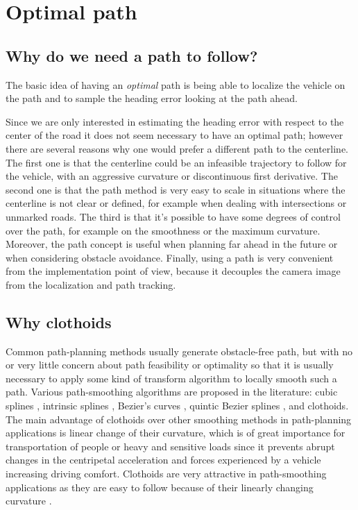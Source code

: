 \documentclass[a4paper,12pt,sort&compress]{article}
\begin{document}
\section{Optimal path}

    \subsection{Why do we need a path to follow?}
    The basic idea of having an \textit{optimal} path is being able to localize the vehicle on the
    path and to sample the heading error looking at the path ahead. 

    Since we are only interested in estimating the heading error with respect to the center of the
    road it does not seem necessary to have an optimal path; however there are several reasons
    why one would prefer a different path to the centerline. The first one is that the centerline
    could be an infeasible trajectory to follow for the vehicle, with an aggressive curvature or
    discontinuous first derivative. The second one is that the path
    method is very easy to scale in situations where the centerline is not clear or defined, for
    example when dealing with intersections or unmarked roads. The third is that it's possible to
    have some degrees of control over the path, for example on the smoothness or the maximum
    curvature. Moreover, the path concept is useful when planning far ahead in the future or when
    considering obstacle avoidance. Finally, using a path is very convenient from the implementation point of
    view, because it decouples the camera image from the localization and path tracking.

    \subsection{Why clothoids}
    Common path-planning methods usually generate obstacle-free path, but with no or very little concern
    about path feasibility or optimality so that it is usually necessary to apply some kind of transform
    algorithm to locally smooth such a path. Various path-smoothing algorithms are proposed in the
    literature: cubic splines \citep*{kanayama1988smooth}, intrinsic splines
    \citep*{delingette1991trajectory}, Bezier's curves \citep*{segovia1991comparative}, quintic
    Bezier splines \citep*{lau2009kinodynamic}, and clothoids. The main advantage of clothoids over
    other smoothing methods in path-planning
    applications is linear change of their curvature, which is of great importance for transportation of
    people or heavy and sensitive loads since it prevents abrupt changes in the centripetal acceleration
    and forces experienced by a vehicle increasing driving comfort. Clothoids are very attractive in
    path-smoothing applications as they are easy to follow because of their linearly changing
    curvature \citep*{shanmugavel2010co}. 
\end{document}
